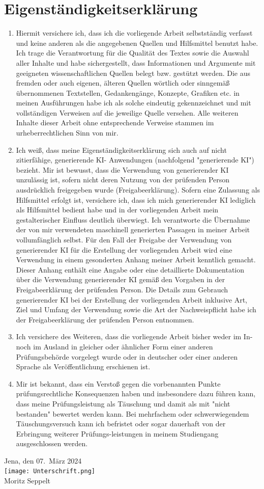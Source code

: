 \documentclass{report}
\theoremstyle{definition}
\begin{document}
\section*{Eigenständigkeitserklärung}
\begin{enumerate}
  \item Hiermit versichere ich, dass ich die vorliegende Arbeit selbstständig verfasst und keine
  anderen als die angegebenen Quellen und Hilfsmittel benutzt habe.
  Ich trage die Verantwortung für die Qualität des Textes sowie die Auswahl aller Inhalte und habe sichergestellt, dass Informationen und Argumente mit geeigneten wissenschaftlichen Quellen belegt bzw. gestützt werden. Die aus fremden oder auch eigenen, älteren Quellen wörtlich oder sinngemäß übernommenen Textstellen, Gedankengänge, Konzepte, Grafiken etc. in meinen Ausführungen habe ich als solche eindeutig gekennzeichnet und mit vollständigen Verweisen auf die jeweilige Quelle versehen. Alle weiteren Inhalte dieser Arbeit ohne entsprechende Verweise
  stammen im urheberrechtlichen Sinn von mir.
  \item Ich weiß, dass meine Eigenständigkeitserklärung sich auch auf nicht zitierfähige, generierende KI-
  Anwendungen (nachfolgend "generierende KI") bezieht.
  Mir ist bewusst, dass die Verwendung von generierender KI unzulässig ist, sofern nicht deren
  Nutzung von der prüfenden Person ausdrücklich freigegeben wurde (Freigabeerklärung). Sofern
  eine Zulassung als Hilfsmittel erfolgt ist, versichere ich, dass ich mich generierender KI lediglich als
  Hilfsmittel bedient habe und in der vorliegenden Arbeit mein gestalterischer Einfluss deutlich
  überwiegt. Ich verantworte die Übernahme der von mir verwendeten maschinell generierten
  Passagen in meiner Arbeit vollumfänglich selbst.
  Für den Fall der Freigabe der Verwendung von generierender KI für die Erstellung der vorliegenden
  Arbeit wird eine Verwendung in einem gesonderten Anhang meiner Arbeit kenntlich gemacht.
  Dieser Anhang enthält eine Angabe oder eine detaillierte Dokumentation über die Verwendung
  generierender KI gemäß den Vorgaben in der Freigabeerklärung der prüfenden Person.
  Die Details zum Gebrauch generierender KI bei der Erstellung der vorliegenden Arbeit inklusive Art,
  Ziel und Umfang der Verwendung sowie die Art der Nachweispflicht habe ich der Freigabeerklärung
  der prüfenden Person entnommen.
  \item Ich versichere des Weiteren, dass die vorliegende Arbeit bisher weder im In- noch im Ausland in
  gleicher oder ähnlicher Form einer anderen Prüfungsbehörde vorgelegt wurde oder in deutscher
  oder einer anderen Sprache als Veröffentlichung erschienen ist.
  \item Mir ist bekannt, dass ein Verstoß gegen die vorbenannten Punkte prüfungsrechtliche
  Konsequenzen haben und insbesondere dazu führen kann, dass meine Prüfungsleistung als
  Täuschung und damit als mit "nicht bestanden" bewertet werden kann. Bei mehrfachem oder
  schwerwiegendem Täuschungsversuch kann ich befristet oder sogar dauerhaft von der Erbringung
  weiterer Prüfungs-leistungen in meinem Studiengang ausgeschlossen werden.
\end{enumerate}
\vspace{1cm}
Jena, den 07.\ März 2024
\vspace{0.5cm}\\
\texttt{[image: Unterschrift.png]}\\
Moritz Seppelt
\end{document}

